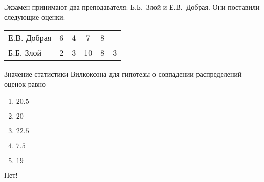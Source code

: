 \documentclass[t]{beamer}
\begin{document}
 \begin{frame} \label{48-No} 
\begin{block}{48} 

Экзамен принимают два преподавателя: Б.Б.~Злой и Е.В.~Добрая. Они поставили следующие оценки:

\vspace{5mm}
\begin{tabular}{lccccc}
  \toprule
   Е.В. Добрая & 6 & 4 & 7  & 8 &   \\
   Б.Б. Злой   & 2 & 3 & 10 & 8 & 3 \\
  \bottomrule
\end{tabular}
\vspace{5mm}


Значение статистики Вилкоксона для гипотезы о совпадении распределений оценок равно


 \end{block} 
\begin{enumerate} 
\item[] \hyperlink{48-No}{\beamergotobutton{} $20.5$}
\item[] \hyperlink{48-No}{\beamergotobutton{} $20$}
\item[] \hyperlink{48-Yes}{\beamergotobutton{} $22.5$}
\item[] \hyperlink{48-No}{\beamergotobutton{} $7.5$}
\item[] \hyperlink{48-No}{\beamergotobutton{} $19$}
\end{enumerate} 

 \alert{Нет!} 
\end{frame} 
\end{document}
